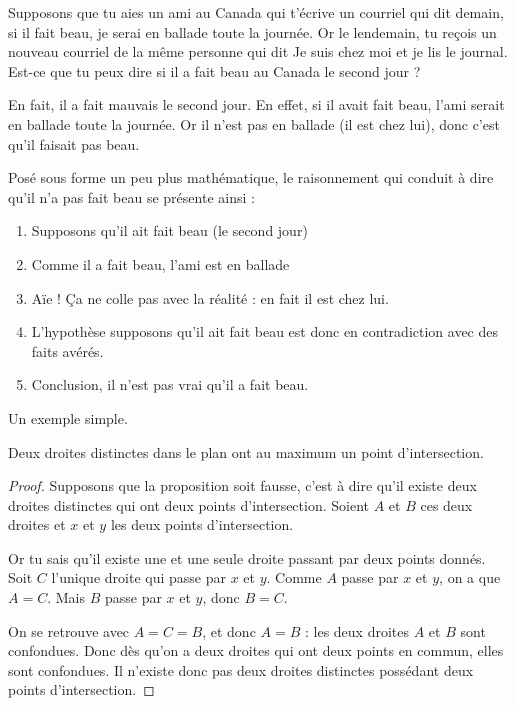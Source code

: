 \documentclass{article}
\begin{document}
Supposons que tu aies un ami au Canada qui t'écrive un courriel qui dit \og demain, si il fait beau, je serai en ballade toute la journée\fg. Or le lendemain, tu reçois un nouveau courriel de la même personne qui dit \og Je suis chez moi et je lis le journal\fg. Est-ce que tu peux dire si il a fait beau au Canada le second jour ?

En fait, il a fait mauvais le second jour. En effet, si il avait fait beau, l'ami serait en ballade toute la journée. Or il n'est pas en ballade (il est chez lui), donc c'est qu'il faisait pas beau.

Posé sous forme un peu plus mathématique, le raisonnement qui conduit à dire qu'il n'a pas fait beau se présente ainsi :
\begin{enumerate}
\item Supposons qu'il ait fait beau (le second jour)
\item Comme il a fait beau, l'ami est en ballade
\item Aïe ! Ça ne colle pas avec la réalité : en fait il est chez lui.
\item L'hypothèse \og supposons qu'il ait fait beau\fg{}  est donc en contradiction avec des faits avérés.
\item Conclusion, il n'est pas vrai qu'il a fait beau.
\end{enumerate}

Un exemple simple.
\begin{proposition}
Deux droites distinctes dans le plan ont au maximum un point d'intersection.
\end{proposition}

\begin{proof}
Supposons que la proposition soit fausse, c'est à dire qu'il existe deux droites distinctes qui ont deux points d'intersection. Soient $A$ et $B$ ces deux droites et $x$ et $y$ les deux points d'intersection.

Or tu sais qu'il existe une et une seule droite passant par deux points donnés. Soit $C$ l'unique droite qui passe par $x$ et $y$. Comme $A$ passe par $x$ et $y$, on a que $A=C$. Mais $B$ passe par $x$ et $y$, donc $B=C$.

On se retrouve avec $A=C=B$, et donc $A=B$ : les deux droites $A$ et $B$ sont confondues. Donc dès qu'on a deux droites qui ont deux points en commun, elles sont confondues. Il n'existe donc pas deux droites distinctes possédant deux points d'intersection.

\end{proof}
\end{document}
